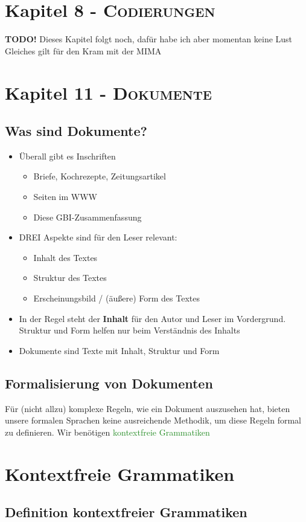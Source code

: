 \documentclass{article}
\newcommand{\kapitel}[2]{Kapitel #1 - \textsc{#2}}
\newcommand{\strongColor}[1]{\textcolor{strongColor}{#1}}
\newcommand{\strong}[1]{\textbf{\strongColor{#1}}}
\newcommand{\important}[1]{\textcolor{importantColor}{#1}}
\newcommand{\verweis}[1]{\textcolor{ForestGreen}{#1}}
\begin{document}
\newpage
\section{\kapitel{8}{Codierungen}}
\strong{TODO!} Dieses Kapitel folgt noch, dafür habe ich aber momentan keine Lust\\Gleiches gilt für den Kram mit der MIMA

\newpage
\section{\kapitel{11}{Dokumente}}
\subsection{Was sind Dokumente?}
\begin{itemize}
    \item Überall gibt es Inschriften
    \begin{itemize}
        \item Briefe, Kochrezepte, Zeitungsartikel
        \item Seiten im WWW
        \item Diese GBI-Zusammenfassung
    \end{itemize}
    \item DREI Aspekte sind für den Leser relevant:
    \begin{itemize}
        \item \important{Inhalt} des Textes
        \item \important{Struktur} des Textes
        \item \important{Erscheinungsbild} / (äußere) \important{Form} des Textes
    \end{itemize}
    \item In der Regel steht der \strong{Inhalt} für den Autor und Leser im Vordergrund.\\
    Struktur und Form helfen nur beim Verständnis des Inhalts
    \item \important{Dokumente} sind Texte mit Inhalt, Struktur und Form
\end{itemize}
\subsection{Formalisierung von Dokumenten}
Für (nicht allzu) komplexe Regeln, wie ein Dokument auszusehen hat, bieten unsere formalen Sprachen keine ausreichende Methodik, um diese Regeln formal zu definieren. Wir benötigen \verweis{kontextfreie Grammatiken} 

\newpage
\section{Kontextfreie Grammatiken}
\subsection{Definition kontextfreier Grammatiken}
\end{document}
